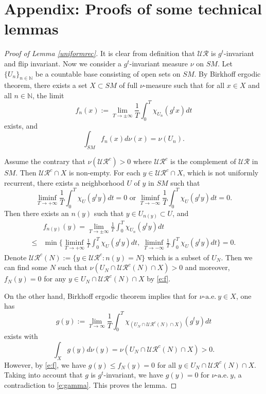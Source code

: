 \documentclass[11pt]{amsart}
\theoremstyle{definition}
\newcommand{\UR}{\mathcal{UR}}
\def\ae{\text{-a.e.}\ }
\begin{document}
\section{Appendix: Proofs of some technical lemmas}
\begin{proof}[Proof of Lemma \ref{uniformrec}]
It is clear from definition that $\UR$ is $g^t$-invariant and flip invariant. Now we consider a $g^t$-invariant measure $\nu$ on $SM$.
Let $\{U_n\}_{n\in\mathbb{N}}$ be a countable base consisting of open sets on $SM$. By Birkhoff ergodic theorem, there exists a set $X \subset SM$ of full $\nu$-measure such that for all $x \in X$ and all $n\in\mathbb{N}$, the limit
$$f_n(x):=\lim_{T \to \pm\infty} \frac{1}{T}\int_0^T \chi_{U_n}(g^tx)dt$$
exists, and
$$\int_{SM}f_n(x)d\nu(x)= \nu(U_n).$$

Assume the contrary that $\nu(\UR^c)>0$ where $\UR^c$ is the complement of $\UR$ in $SM$. Then $\UR^c \cap X$ is non-empty. For each $y \in\UR^c \cap X$, which is not uniformly recurrent, there exists a neighborhood $U$ of $y$ in $SM$ such that
\begin{equation*}\label{e:not}
 \liminf_{T \to +\infty} \frac{1}{T}\int_0^T \chi_U(g^ty)dt =0 \text{\ \ or\ \ } \liminf_{T \to -\infty} \frac{1}{T}\int_0^T \chi_U(g^ty)dt =0.
\end{equation*}
Then there exists an $n(y)$ such that $y\in U_{n(y)} \subset U$, and
\begin{equation}\label{e:f}
\begin{aligned}
 &f_{n(y)}(y)=\lim_{T \to \pm\infty} \frac{1}{T}\int_0^T \chi_{U_n}(g^ty)dt\\
 \leq &\min\Big\{\liminf_{T \to +\infty} \frac{1}{T}\int_0^T \chi_U(g^ty)dt,\  \liminf_{T \to -\infty} \frac{1}{T}\int_0^T \chi_U(g^ty)dt\Big\} =0.
\end{aligned}
\end{equation}
Denote $\UR^c(N):=\{y\in \UR^c: n(y)=N\}$ which is a subset of $U_N$.
Then we can find some $N$ such that $\nu (U_N \cap \UR^c(N) \cap X)>0$ and moreover, $f_N(y)=0$ for any $y \in U_N \cap \UR^c(N)\cap X$ by \eqref{e:f}.

On the other hand, Birkhoff ergodic theorem implies that for $\nu \ae y \in X$, one has
$$g(y):=\lim_{T \to \infty} \frac{1}{T}\int_0^T \chi_{(U_N \cap \UR^c(N)\cap X)}(g^ty)dt$$
exists with
\begin{equation}\label{e:gamma}
\int_{X}g(y)d\nu(y)=\nu(U_N \cap \UR^c(N)\cap X) >0.
\end{equation}
However, by \eqref{e:f}, we have $g(y) \leq f_N(y)=0$ for all $y \in U_N \cap \UR^c(N)\cap X$. Taking into account that $g$ is $g^t$-invariant, we have $g(y)=0$ for $\nu \ae y$, a contradiction to \eqref{e:gamma}. This proves the lemma.
\end{proof}
\end{document}
